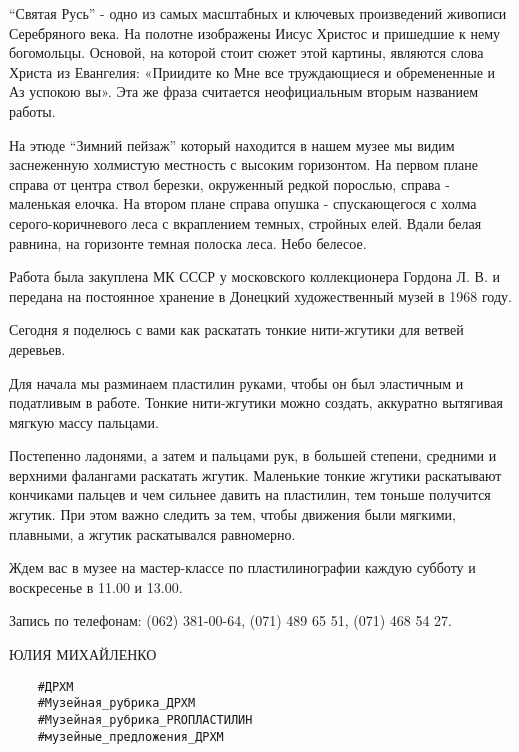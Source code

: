 \enquote{Святая Русь} - одно из самых масштабных и ключевых произведений
живописи Серебряного века. На полотне изображены Иисус Христос и пришедшие к
нему богомольцы. Основой, на которой стоит сюжет этой картины, являются слова
Христа из Евангелия: «Приидите ко Мне все труждающиеся и обремененные и Аз
успокою вы». Эта же фраза считается неофициальным вторым названием работы.


На этюде \enquote{Зимний пейзаж} который находится в нашем музее мы видим
заснеженную холмистую местность с высоким горизонтом.  На первом плане справа
от центра ствол березки,  окруженный редкой порослью,  справа - маленькая
елочка. На втором плане  справа опушка - спускающегося с холма
серого-коричневого леса с вкраплением темных,  стройных елей.  Вдали белая
равнина,  на горизонте темная полоска леса.  Небо белесое.

Работа была закуплена МК СССР у московского коллекционера Гордона Л. В. и
передана на постоянное хранение в Донецкий художественный музей в 1968 году.


Сегодня я поделюсь с вами как раскатать тонкие нити-жгутики для ветвей
деревьев.

Для начала мы разминаем пластилин руками, чтобы он был эластичным и податливым
в работе. Тонкие нити-жгутики можно создать, аккуратно вытягивая мягкую массу
пальцами.

Постепенно ладонями, а затем и пальцами рук, в большей степени, средними и
верхними фалангами раскатать жгутик. Маленькие тонкие жгутики раскатывают
кончиками пальцев и чем сильнее давить на пластилин, тем тоньше получится
жгутик. При этом важно следить за тем, чтобы движения были мягкими, плавными, а
жгутик раскатывался равномерно.

Ждем вас в музее на мастер-классе по пластилинографии каждую субботу и
воскресенье в 11.00 и 13.00.

Запись по телефонам: (062) 381-00-64, (071) 489 65 51, (071) 468 54 27.
 
ЮЛИЯ МИХАЙЛЕНКО
 
\begin{verbatim}
	#ДРХМ
	#Музейная_рубрика_ДРХМ
	#Музейная_рубрика_PROПЛАСТИЛИН
	#музейные_предложения_ДРХМ
\end{verbatim}
